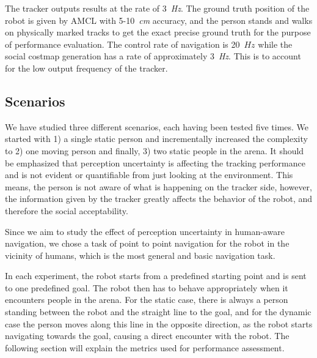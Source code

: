 The tracker outputs results at the rate of 3~\textit{Hz}. The ground truth position of the robot is given by AMCL with 5-10~\textit{cm} accuracy, and the person stands and walks on physically marked tracks to get the exact precise ground truth for the purpose of performance evaluation.
The control rate of navigation is 20~$Hz$ while the social costmap generation has a rate of approximately 3~\textit{Hz}. This is to account for the low output frequency of the tracker.


\subsection{Scenarios}
\label{sec:scenarios}

We have studied three different scenarios, each having been tested five times. We started with 1) a single static person and incrementally increased the complexity to 2) one moving person and finally, 3) two static people in the arena. It should be emphasized that perception uncertainty is affecting the tracking performance and is not evident or quantifiable from just looking at the environment. This means, the person is not aware of what is happening on the tracker side, however, the information given by the tracker greatly affects the behavior of the robot, and therefore the social acceptability. 


Since we aim to study the effect of perception uncertainty in human-aware navigation, we chose a task of point to point navigation for the robot in the vicinity of humans, which is the most general and basic navigation task.


In each experiment, the robot starts from a predefined starting point and is sent to one predefined goal. The robot then has to behave appropriately when it encounters people in the arena. For the static case, there is always a person standing between the robot and the straight line to the goal, and for the dynamic case the person moves along this line in the opposite direction, as the robot starts navigating towards the goal, causing a direct encounter with the robot. The following section will explain the metrics used for performance assessment.%

